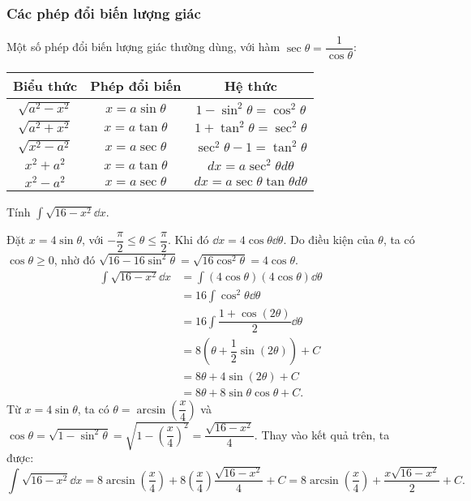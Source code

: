 \subsubsection{Các phép đổi biến lượng giác}
Một số phép đổi biến lượng giác thường dùng, với hàm $\sec\theta = \dfrac{1}{\cos\theta}$:
\begin{center}
    \begin{tabular}{|c|c|c|}
        \hline
        \textbf{Biểu thức} & \textbf{Phép đổi biến} & \textbf{Hệ thức} \\
        \hline
        $\sqrt{a^2 - x^2}$ & $x = a \sin\theta$ & $1 - \sin^2\theta = \cos^2\theta$ \\
        \hline
        $\sqrt{a^2 + x^2}$ & $x = a \tan\theta$ & $1 + \tan^2\theta = \sec^2\theta$ \\
        \hline
        $\sqrt{x^2 - a^2}$ & $x = a \sec\theta$ & $\sec^2\theta - 1 = \tan^2\theta$ \\
        \hline
        $x^2 + a^2$ & $x = a \tan\theta$ & $dx = a \sec^2\theta d\theta$ \\
        \hline
        $x^2 - a^2$ & $x = a \sec\theta$ & $dx = a \sec\theta \tan\theta d\theta$ \\
        \hline
    \end{tabular}
\end{center}

\begin{example}
    Tính $\int \sqrt{16 - x^2} \dd x$.
\end{example}
\begin{solution}
    Đặt $x = 4\sin\theta$, với $-\dfrac{\pi}{2} \le \theta \le \dfrac{\pi}{2}$. Khi đó $\dd x = 4\cos\theta \dd\theta$.
    Do điều kiện của $\theta$, ta có $\cos\theta \ge 0$, nhờ đó $\sqrt{16 - 16\sin^2\theta} = \sqrt{16\cos^2\theta} = 4\cos\theta$.
    \begin{align*}
        \int \sqrt{16 - x^2} \dd x &= \int (4\cos\theta)(4\cos\theta) \dd\theta \\
        &= 16 \int \cos^2\theta \dd\theta \\
        &= 16 \int \dfrac{1 + \cos(2\theta)}{2} \dd\theta \\
        &= 8 \left(\theta + \dfrac{1}{2}\sin(2\theta) \right) + C \\
        &= 8\theta + 4\sin(2\theta) + C \\
        &= 8\theta + 8\sin\theta\cos\theta + C.
    \end{align*}
    Từ $x = 4\sin\theta$, ta có $\theta = \arcsin\left(\dfrac{x}{4}\right)$ và $\cos\theta = \sqrt{1 - \sin^2\theta} = \sqrt{1 - \left(\dfrac{x}{4}\right)^2} = \dfrac{\sqrt{16 - x^2}}{4}$.
    Thay vào kết quả trên, ta được:
    \[
        \int \sqrt{16 - x^2} \dd x = 8\arcsin\left(\dfrac{x}{4}\right) + 8\left(\dfrac{x}{4}\right)\dfrac{\sqrt{16 - x^2}}{4} + C = 8\arcsin\left(\dfrac{x}{4}\right) + \dfrac{x\sqrt{16-x^2}}{2} + C.
    \]
\end{solution}

